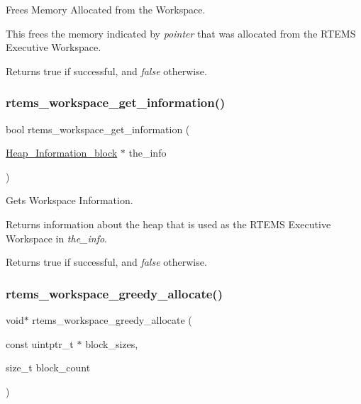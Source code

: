 Frees Memory Allocated from the Workspace. 

This frees the memory indicated by {\itshape pointer} that was allocated from the R\+T\+E\+MS Executive Workspace.

Returns {\ttfamily true} if successful, and {\itshape false} otherwise. \mbox{\label{group__ClassicRTEMSWorkspace_ga95815bb0f8f80d806ffafe7fa47ab5c7}} 
\subsubsection{\texorpdfstring{rtems\_workspace\_get\_information()}{rtems\_workspace\_get\_information()}}
{\footnotesize\ttfamily bool rtems\+\_\+workspace\+\_\+get\+\_\+information (\begin{DoxyParamCaption}\item[{\mbox{\hyperlink{structHeap__Information__block}{Heap\+\_\+\+Information\+\_\+block}} $\ast$}]{the\+\_\+info }\end{DoxyParamCaption})}



Gets Workspace Information. 

Returns information about the heap that is used as the R\+T\+E\+MS Executive Workspace in {\itshape the\+\_\+info}.

Returns {\ttfamily true} if successful, and {\itshape false} otherwise. \mbox{\label{group__ClassicRTEMSWorkspace_gac04da5a16a78a69df042a654558aca2b}} 
\subsubsection{\texorpdfstring{rtems\_workspace\_greedy\_allocate()}{rtems\_workspace\_greedy\_allocate()}}
{\footnotesize\ttfamily void$\ast$ rtems\+\_\+workspace\+\_\+greedy\+\_\+allocate (\begin{DoxyParamCaption}\item[{const uintptr\+\_\+t $\ast$}]{block\+\_\+sizes,  }\item[{size\+\_\+t}]{block\+\_\+count }\end{DoxyParamCaption})}



